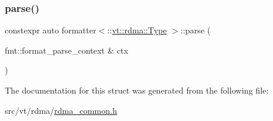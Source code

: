 \mbox{\label{structformatter_3_1_1vt_1_1rdma_1_1_type_01_4_ae1f8eb96c0e31df9a0e50ea77522612f}} 
\subsubsection{\texorpdfstring{parse()}{parse()}}
{\footnotesize\ttfamily constexpr auto formatter$<$\+::\hyperlink{namespacevt_1_1rdma_ac848e1d9da43db6294bd06f83e5d3946}{vt\+::rdma\+::\+Type} $>$\+::parse (\begin{DoxyParamCaption}\item[{fmt\+::format\+\_\+parse\+\_\+context \&}]{ctx }\end{DoxyParamCaption})\hspace{0.3cm}{\ttfamily [inline]}}



The documentation for this struct was generated from the following file\+:\begin{DoxyCompactItemize}
\item 
src/vt/rdma/\hyperlink{rdma__common_8h}{rdma\+\_\+common.\+h}\end{DoxyCompactItemize}

